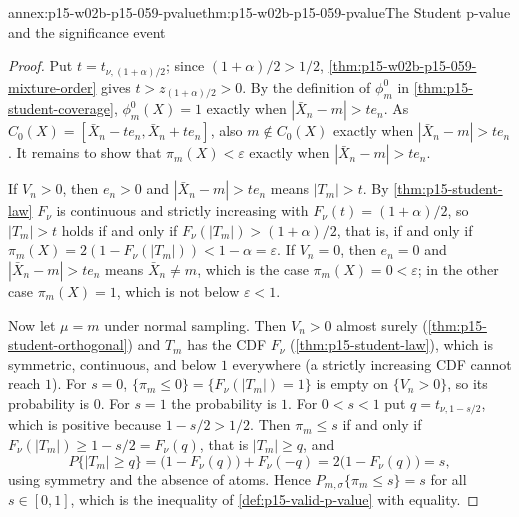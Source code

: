\begin{annexitem}{annex:p15-w02b-p15-059-pvalue}{thm:p15-w02b-p15-059-pvalue}{The Student p-value and the significance event}
\begin{proof}
Put \(t=t_{\nu,(1+\alpha)/2}\); since \((1+\alpha)/2>1/2\),
\cref{thm:p15-w02b-p15-059-mixture-order} gives \(t>z_{(1+\alpha)/2}>0\).
By the definition of \(\phi_m^0\) in \cref{thm:p15-student-coverage},
\(\phi_m^0(X)=1\) exactly when \(|\bar X_n-m|>te_n\). As
\(C_0(X)=[\bar X_n-te_n,\bar X_n+te_n]\), also \(m\notin C_0(X)\) exactly
when \(|\bar X_n-m|>te_n\). It remains to show that \(\pi_m(X)<\varepsilon\)
exactly when \(|\bar X_n-m|>te_n\).

If \(V_n>0\), then \(e_n>0\) and \(|\bar X_n-m|>te_n\) means \(|T_m|>t\).
By \cref{thm:p15-student-law} \(F_\nu\) is continuous and strictly
increasing with \(F_\nu(t)=(1+\alpha)/2\), so \(|T_m|>t\) holds if and only
if \(F_\nu(|T_m|)>(1+\alpha)/2\), that is, if and only if
\(\pi_m(X)=2(1-F_\nu(|T_m|))<1-\alpha=\varepsilon\). If \(V_n=0\), then
\(e_n=0\) and \(|\bar X_n-m|>te_n\) means \(\bar X_n\neq m\), which is the
case \(\pi_m(X)=0<\varepsilon\); in the other case \(\pi_m(X)=1\), which is
not below \(\varepsilon<1\).

Now let \(\mu=m\) under normal sampling. Then \(V_n>0\) almost surely
(\cref{thm:p15-student-orthogonal}) and \(T_m\) has the CDF \(F_\nu\)
(\cref{thm:p15-student-law}), which is symmetric, continuous, and below
\(1\) everywhere (a strictly increasing CDF cannot reach \(1\)). For
\(s=0\), \(\{\pi_m\leq0\}=\{F_\nu(|T_m|)=1\}\) is empty on \(\{V_n>0\}\),
so its probability is \(0\). For \(s=1\) the probability is \(1\). For
\(0<s<1\) put \(q=t_{\nu,1-s/2}\), which is positive because
\(1-s/2>1/2\). Then \(\pi_m\leq s\) if and only if
\(F_\nu(|T_m|)\geq1-s/2=F_\nu(q)\), that is \(|T_m|\geq q\), and
\[
 P\{|T_m|\geq q\}=\bigl(1-F_\nu(q)\bigr)+F_\nu(-q)
 =2\bigl(1-F_\nu(q)\bigr)=s ,
\]
using symmetry and the absence of atoms. Hence
\(P_{m,\sigma}\{\pi_m\leq s\}=s\) for all \(s\in[0,1]\), which is the
inequality of \cref{def:p15-valid-p-value} with equality.
\end{proof}
\end{annexitem}

